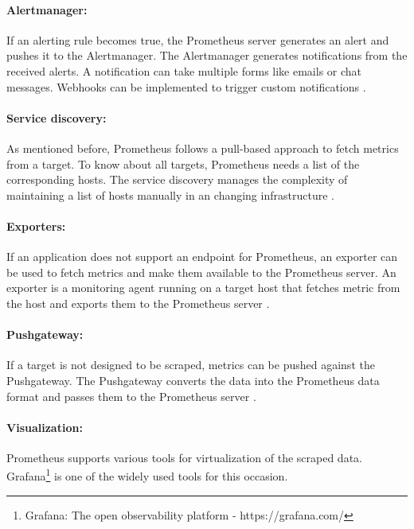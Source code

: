 \paragraph{Alertmanager:}
If an alerting rule becomes true, the Prometheus server generates an alert and pushes it to the Alertmanager. The Alertmanager generates notifications from the received alerts. A notification can take multiple forms like emails or chat messages. Webhooks can be implemented to trigger custom notifications \cite{Bastos2019Prom}.


\paragraph{Service discovery:}
As mentioned before, Prometheus follows a pull-based approach to fetch metrics from a target. To know about all targets, Prometheus needs a list of the corresponding hosts. The service discovery manages the complexity of maintaining a list of hosts manually in an changing infrastructure \cite{Bastos2019Prom}.


\paragraph{Exporters:}
If an application does not support an endpoint for Prometheus, an exporter can be used to fetch metrics and make them available to the Prometheus server. An exporter is a monitoring agent running on a target host that fetches metric from the host and exports them to the Prometheus server \cite{Pandey2020Monitoring}.


\paragraph{Pushgateway:}
If a target is not designed to be scraped, metrics can be pushed against the Pushgateway\cite{Prom2020Docs}. The Pushgateway converts the data into the Prometheus data format and passes them to the Prometheus server \cite{Pandey2020Monitoring}.


\paragraph{Visualization:}
Prometheus supports various tools for virtualization of the scraped data. Grafana\footnote{Grafana: The open observability platform - https://grafana.com/} is one of the widely used tools for this occasion.




